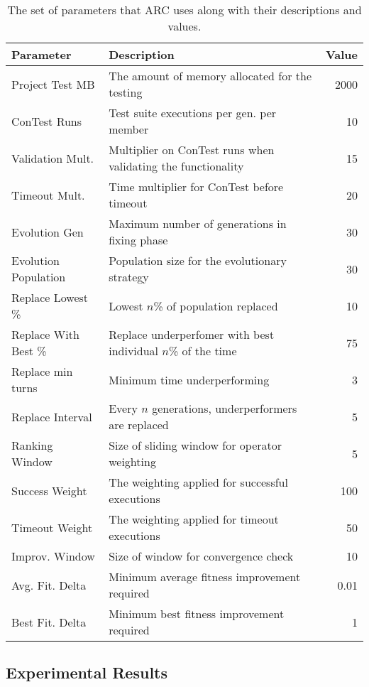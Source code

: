 \begin{table}[t!]
\caption{The set of parameters that ARC uses along with their descriptions and values.}
\begin{center}
\lstset{basicstyle=\scriptsize}
\begin{tabular}{|l|p{7.5cm}|r|}
\hline
\textbf{Parameter} & \textbf{Description} & \textbf{Value}\\
\hline
Project Test MB & The amount of memory allocated for the testing & 2000\\
\hline
ConTest Runs & Test suite executions per gen. per member & 10\\
\hline
Validation Mult. & Multiplier on ConTest runs when validating the functionality & 15\\
\hline
Timeout Mult. & Time multiplier for ConTest before timeout & 20\\
\hline
Evolution Gen & Maximum number of generations in fixing phase & 30\\
\hline
Evolution Population & Population size for the evolutionary strategy & 30\\
\hline
Replace Lowest \% & Lowest $n$\% of population replaced & 10\\
\hline
Replace With Best \% & Replace underperfomer with best individual $n$\% of the time & 75\\
\hline
Replace min turns & Minimum time underperforming & 3\\
\hline
Replace Interval & Every $n$ generations, underperformers are replaced & 5\\
\hline
Ranking Window & Size of sliding window for operator weighting & 5\\
\hline
Success Weight & The weighting applied for successful executions & 100\\
\hline
Timeout Weight & The weighting applied for timeout executions & 50\\
\hline
Improv. Window & Size of window for convergence check & 10\\
\hline
Avg. Fit. Delta & Minimum average fitness improvement required & 0.01\\
\hline
Best Fit. Delta & Minimum best fitness improvement required & 1\\
\hline
\end{tabular}
\label{tbl:used_parameters}
\end{center}
\end{table}

\subsection{Experimental Results}
\label{sec:experimental_results}

